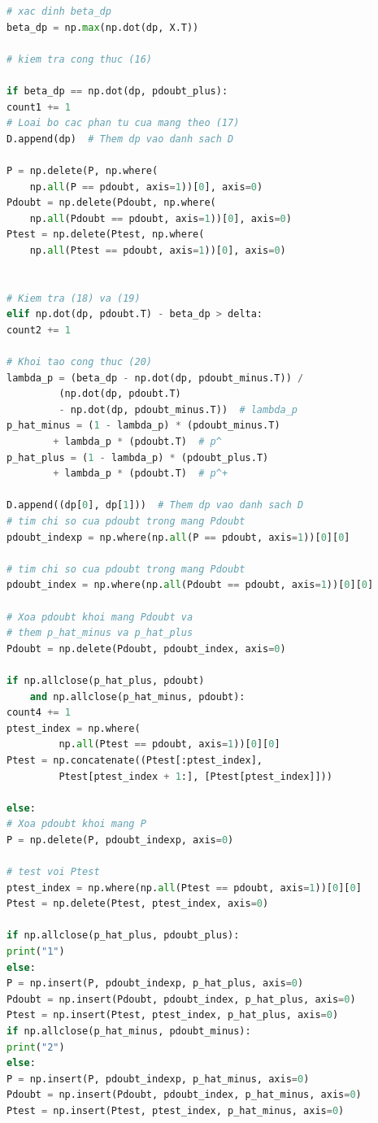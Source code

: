 \documentclass[12pt,a4paper,openany,oneside]{report}
\begin{document}
\begin{lstlisting}[language=Python, caption={Mô tả mã nguồn Python}, label={lst:python-code}]
# xac dinh beta_dp
beta_dp = np.max(np.dot(dp, X.T))

# kiem tra cong thuc (16)

if beta_dp == np.dot(dp, pdoubt_plus):
count1 += 1
# Loai bo cac phan tu cua mang theo (17)
D.append(dp)  # Them dp vao danh sach D

P = np.delete(P, np.where(
	np.all(P == pdoubt, axis=1))[0], axis=0)
Pdoubt = np.delete(Pdoubt, np.where(
	np.all(Pdoubt == pdoubt, axis=1))[0], axis=0)
Ptest = np.delete(Ptest, np.where(
	np.all(Ptest == pdoubt, axis=1))[0], axis=0)


# Kiem tra (18) va (19)
elif np.dot(dp, pdoubt.T) - beta_dp > delta:
count2 += 1

# Khoi tao cong thuc (20)
lambda_p = (beta_dp - np.dot(dp, pdoubt_minus.T)) /
		 (np.dot(dp, pdoubt.T) 
		 - np.dot(dp, pdoubt_minus.T))  # lambda_p
p_hat_minus = (1 - lambda_p) * (pdoubt_minus.T) 
		+ lambda_p * (pdoubt.T)  # p^
p_hat_plus = (1 - lambda_p) * (pdoubt_plus.T)
		+ lambda_p * (pdoubt.T)  # p^+

D.append((dp[0], dp[1]))  # Them dp vao danh sach D
# tim chi so cua pdoubt trong mang Pdoubt
pdoubt_indexp = np.where(np.all(P == pdoubt, axis=1))[0][0]

# tim chi so cua pdoubt trong mang Pdoubt
pdoubt_index = np.where(np.all(Pdoubt == pdoubt, axis=1))[0][0]

# Xoa pdoubt khoi mang Pdoubt va
# them p_hat_minus va p_hat_plus
Pdoubt = np.delete(Pdoubt, pdoubt_index, axis=0)

if np.allclose(p_hat_plus, pdoubt) 
    and np.allclose(p_hat_minus, pdoubt):
count4 += 1
ptest_index = np.where(
		 np.all(Ptest == pdoubt, axis=1))[0][0]
Ptest = np.concatenate((Ptest[:ptest_index],
		 Ptest[ptest_index + 1:], [Ptest[ptest_index]]))

else:
# Xoa pdoubt khoi mang P
P = np.delete(P, pdoubt_indexp, axis=0)

# test voi Ptest
ptest_index = np.where(np.all(Ptest == pdoubt, axis=1))[0][0]
Ptest = np.delete(Ptest, ptest_index, axis=0)

if np.allclose(p_hat_plus, pdoubt_plus):
print("1")
else:
P = np.insert(P, pdoubt_indexp, p_hat_plus, axis=0)
Pdoubt = np.insert(Pdoubt, pdoubt_index, p_hat_plus, axis=0)
Ptest = np.insert(Ptest, ptest_index, p_hat_plus, axis=0)
if np.allclose(p_hat_minus, pdoubt_minus):
print("2")
else:
P = np.insert(P, pdoubt_indexp, p_hat_minus, axis=0)
Pdoubt = np.insert(Pdoubt, pdoubt_index, p_hat_minus, axis=0)
Ptest = np.insert(Ptest, ptest_index, p_hat_minus, axis=0)



\end{lstlisting}
\end{document}

